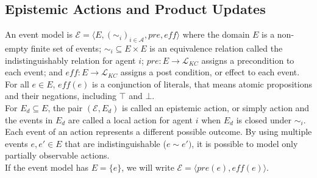 \subsection{Epistemic Actions and Product Updates}

An event model is $\mathcal{E} = \langle E, (\sim_i)_{i\in \mathcal{A}}, pre, \textit{eff}  \rangle$ where the domain $E$ is a non-empty finite set of events; $\sim_i \subseteq E \times E$ is an equivalence relation called the indistinguishably relation for agent $i$;
$pre:E \rightarrow \mathcal{L}_{KC}$ assigns a precondition to each event;
and $\textit{eff}:E \rightarrow \mathcal{L}_{KC}$ assigns a post condition, or effect to each event.
For all $e\in E$, $\textit{eff}(e)$ is a conjunction of literals, that means atomic propositions and their negations, including $\top$ and $\bot$.\\
For $E_d \subseteq E$, the pair $(\mathcal{E}, E_d)$ is called an epistemic action, or simply action and the events in $E_d$ are called a local action for agent $i$ when $E_d$ is closed under $\sim_i$. \\
Each event of an action represents a different possible outcome.
By using multiple events $e, e' \in E$ that are indistinguishable ($e \sim e' )$, it is possible to model only partially observable actions.\\
If the event model has $E=\{e\}$, we will write $\mathcal{E}=\langle pre(e), \textit{eff}(e)\rangle$.

